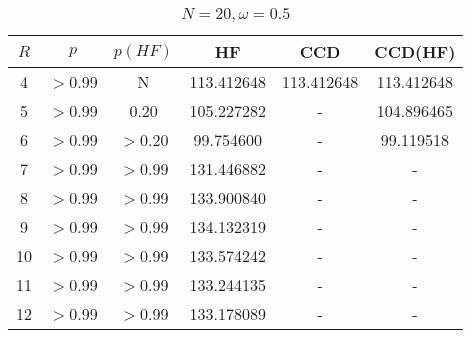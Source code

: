     \begin{table}[H]
    \centering
    \caption{$N = 20, \omega = 0.5$}
    \begin{tabular}{cccccc}
    \toprule
    $R$ & $p$ & $p(HF)$ & HF & CCD & CCD(HF) \\
    \midrule
    4 & $>$0.99 & N & 113.412648 & 113.412648 & 113.412648 \\
    5 & $>$0.99 & 0.20 & 105.227282 & - & 104.896465 \\
    6 & $>$0.99 & $>$0.20 & 99.754600 & - & 99.119518 \\
    7 & $>$0.99 & $>$0.99 & 131.446882 & - & - \\
    8 & $>$0.99 & $>$0.99 & 133.900840 & - & - \\
    9 & $>$0.99 & $>$0.99 & 134.132319 & - & - \\
    10 & $>$0.99 & $>$0.99 & 133.574242 & - & - \\
    11 & $>$0.99 & $>$0.99 & 133.244135 & - & - \\
    12 & $>$0.99 & $>$0.99 & 133.178089 & - & - \\
    \bottomrule
    \end{tabular}
\end{table}
    
    